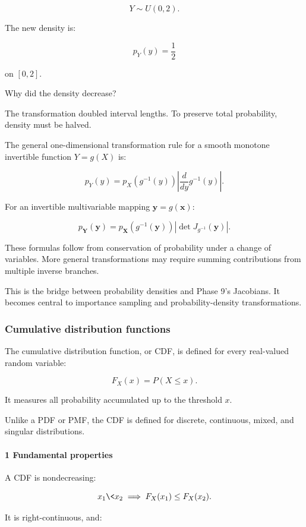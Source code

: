 \[
 Y\sim U(0,2).
\]

The new density is:

\[
 p_Y(y)=\frac12
\]

on \([0,2]\).

Why did the density decrease?

The transformation doubled interval lengths. To preserve total probability, density must be halved.

The general one-dimensional transformation rule for a smooth monotone invertible function \(Y=g(X)\) is:

\[
 \boxed{ p_Y(y) = p_X(g^{-1}(y)) \left| \frac{d}{dy}g^{-1}(y) \right| }.
\]

For an invertible multivariable mapping \(\mathbf y=g(\mathbf x)\):

\[
 \boxed{ p_{\mathbf Y}(\mathbf y) = p_{\mathbf X}(g^{-1}(\mathbf y)) \left| \det J_{g^{-1}}(\mathbf y) \right| }.
\]

These formulas follow from conservation of probability under a change of variables. More general transformations may require summing contributions from multiple inverse branches.

This is the bridge between probability densities and Phase 9's Jacobians. It becomes central to importance sampling and probability-density transformations.

\subsubsection{Cumulative distribution functions}\label{cumulative-distribution-functions}

The cumulative distribution function, or CDF, is defined for every real-valued random variable:

\[
 \boxed{ F_X(x)=P(X\le x) }.
\]

It measures all probability accumulated up to the threshold \(x\).

Unlike a PDF or PMF, the CDF is defined for discrete, continuous, mixed, and singular distributions.

\paragraph{1 Fundamental properties}\label{fundamental-properties}

A CDF is nondecreasing:

\[
 x_1\<x_2 \implies F_X(x_1)\le F_X(x_2).
\]

It is right-continuous, and:

